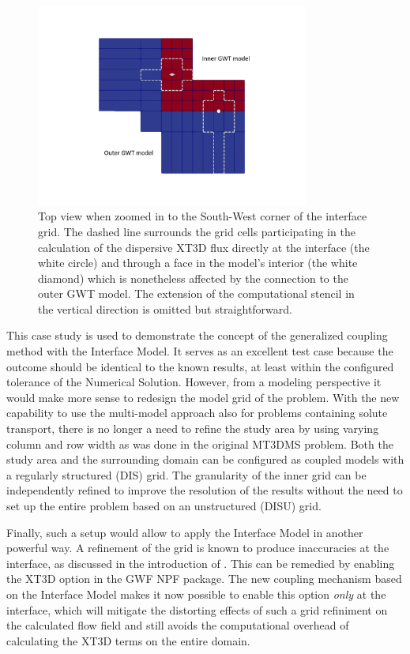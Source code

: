 \begin{figure}[!ht]
	\begin{center}
	\includegraphics[width=0.8\textwidth]{./Figures/InterfaceModel/gwt-ifmod-stencils.png}
	\caption[Stencil size and the extent of the Interface Model grid]{Top view when zoomed in to the South-West corner of the interface grid. The dashed line surrounds the grid cells participating in the calculation of the dispersive XT3D flux directly at the interface (the white circle) and through a face in the model’s interior (the white diamond) which is nonetheless affected by the connection to the outer GWT model. The extension of the computational stencil in the vertical direction is omitted but straightforward.}
	\label{fig:gwtgwt-stencils}
	\end{center}
\end{figure}

This case study is used to demonstrate the concept of the generalized coupling method with the Interface Model. It serves as an excellent test case because the outcome should be identical to the known results, at least within the configured tolerance of the Numerical Solution. However, from a modeling perspective it would make more sense to redesign the model grid of the problem. With the new capability to use the multi-model approach also for problems containing solute transport, there is no longer a need to refine the study area by using varying column and row width as was done in the original MT3DMS problem. Both the study area and the surrounding domain can be configured as coupled models with a regularly structured (DIS) grid. The granularity of the inner grid can be independently refined to improve the resolution of the results without the need to set up the entire problem based on an unstructured (DISU) grid.

Finally, such a setup would allow to apply the Interface Model in another powerful way. A refinement of the grid is known to produce inaccuracies at the interface, as discussed in the introduction of \cite{modflow6xt3d}. This can be remedied by enabling the XT3D option in the GWF NPF package. The new coupling mechanism based on the Interface Model makes it now possible to enable this option \emph{only} at the interface, which will mitigate the distorting effects of such a grid refiniment on the calculated flow field and still avoids the computational overhead of calculating the XT3D terms on the entire domain.

